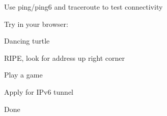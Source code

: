 \documentclass[20pt,landscape,a4paper,footrule]{foils}
\begin{document}
\begin{list1}
\item Use ping/ping6 and traceroute to test connectivity
\item Try in your browser:
\begin{list2}
\item {} Dancing turtle
\item {} RIPE, look for address up right corner
\item {} Play a game
\item {} Apply for IPv6 tunnel
\end{list2}
\item Done \smiley
\end{list1}
\end{document}
